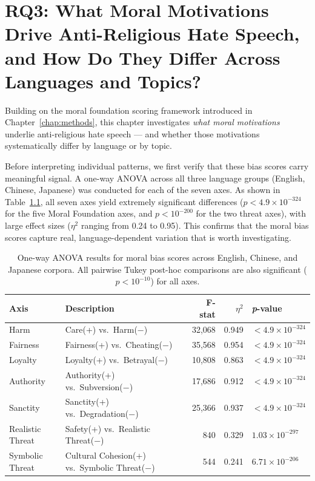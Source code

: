 \documentclass[../CLthesis.tex]{subfiles}
\begin{document}
\chapter{RQ3: What Moral Motivations Drive Anti-Religious Hate Speech, and How Do They Differ Across Languages and Topics?}%
\label{chap:why}

Building on the moral foundation scoring framework introduced in Chapter~\ref{chap:methods}, this chapter investigates \textit{what moral motivations} underlie anti-religious hate speech — and whether those motivations systematically differ by language or by topic. 

Before interpreting individual patterns, we first verify that these bias scores carry meaningful signal. A one-way ANOVA across all three language groups (English, Chinese, Japanese) was conducted for each of the seven axes. As shown in Table~\ref{tab:rq3_anova}, all seven axes yield extremely significant differences ($p < 4.9 \times 10^{-324}$ for the five Moral Foundation axes, and $p < 10^{-200}$ for the two threat axes), with large effect sizes ($\eta^2$ ranging from 0.24 to 0.95). This confirms that the moral bias scores capture real, language-dependent variation that is worth investigating.

\begin{table}[htbp]
\centering
\caption{One-way ANOVA results for moral bias scores across English, Chinese, and Japanese corpora. All pairwise Tukey post-hoc comparisons are also significant ($p < 10^{-10}$) for all axes.}
\label{tab:rq3_anova}
\begin{tabularx}{\textwidth}{l X r r l}
\toprule
\textbf{Axis} & \textbf{Description} & \textbf{F-stat} & \boldmath$\eta^2$ & \textbf{\textit{p}-value} \\
\midrule
Harm             & Care(+) vs.\ Harm(−)                         & 32{,}068 & 0.949 & $< 4.9 \times 10^{-324}$ \\
Fairness         & Fairness(+) vs.\ Cheating(−)                 & 35{,}568 & 0.954 & $< 4.9 \times 10^{-324}$ \\
Loyalty          & Loyalty(+) vs.\ Betrayal(−)                  & 10{,}808 & 0.863 & $< 4.9 \times 10^{-324}$ \\
Authority        & Authority(+) vs.\ Subversion(−)              & 17{,}686 & 0.912 & $< 4.9 \times 10^{-324}$ \\
Sanctity         & Sanctity(+) vs.\ Degradation(−)              & 25{,}366 & 0.937 & $< 4.9 \times 10^{-324}$ \\
Realistic Threat & Safety(+) vs.\ Realistic Threat(−)           &    840   & 0.329 & $1.03 \times 10^{-297}$  \\
Symbolic Threat  & Cultural Cohesion(+) vs.\ Symbolic Threat(−) &    544   & 0.241 & $6.71 \times 10^{-206}$  \\
\bottomrule
\end{tabularx}
\end{table}
\end{document}
